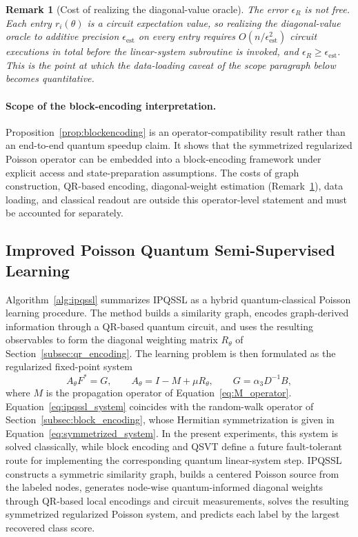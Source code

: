 \documentclass[11pt,a4paper]{article}
\newtheorem{remark}{Remark}
\begin{document}
\begin{remark}[Cost of realizing the diagonal-value oracle]
\label{rem:diag_oracle_cost}
The error $\epsilon_R$ is not free. Each entry $r_i(\theta)$ is a circuit
expectation value, so realizing the diagonal-value oracle to additive
precision $\epsilon_{\mathrm{est}}$ on every entry requires
$O(n/\epsilon_{\mathrm{est}}^{2})$ circuit executions in total before the
linear-system subroutine is invoked, and
$\epsilon_R\geq\epsilon_{\mathrm{est}}$. This is the point at which the
data-loading caveat of the scope paragraph below becomes quantitative.
\end{remark}

\paragraph{Scope of the block-encoding interpretation.}
Proposition~\ref{prop:blockencoding} is an operator-compatibility result
rather than an end-to-end quantum speedup claim. It shows that the
symmetrized regularized Poisson operator can be embedded into a
block-encoding framework under explicit access and state-preparation
assumptions. The costs of graph construction, QR-based encoding,
diagonal-weight estimation (Remark~\ref{rem:diag_oracle_cost}), data
loading, and classical readout are outside this operator-level statement
and must be accounted for separately.

\subsection{Improved Poisson Quantum Semi-Supervised Learning}
\label{subsec:ipqssl}

Algorithm~\ref{alg:ipqssl} summarizes IPQSSL as a hybrid quantum-classical
Poisson learning procedure. The method builds a similarity graph, encodes
graph-derived information through a QR-based quantum circuit, and uses the
resulting observables to form the diagonal weighting matrix $R_\theta$ of
Section~\ref{subsec:qr_encoding}. The learning problem is then formulated as
the regularized fixed-point system
\begin{equation}
 A_\theta F^\ast = G,
\qquad
A_\theta = I-M+\mu R_\theta,
\qquad
G=\alpha_3D^{-1}B,
\label{eq:ipqssl_system}
\end{equation}
where $M$ is the propagation operator of Equation~\eqref{eq:M_operator}.
Equation~\eqref{eq:ipqssl_system} coincides with the random-walk operator of
Section~\ref{subsec:block_encoding}, whose Hermitian symmetrization is given
in Equation~\eqref{eq:symmetrized_system}. In the present experiments, this
system is solved classically, while block encoding and QSVT define a future
fault-tolerant route for implementing the corresponding quantum linear-system step. IPQSSL constructs a symmetric similarity graph, builds a centered Poisson source from the labeled nodes, generates node-wise quantum-informed diagonal weights through QR-based local encodings and circuit measurements, solves the resulting symmetrized regularized Poisson system, and predicts each label by the largest recovered class score.
\end{document}
